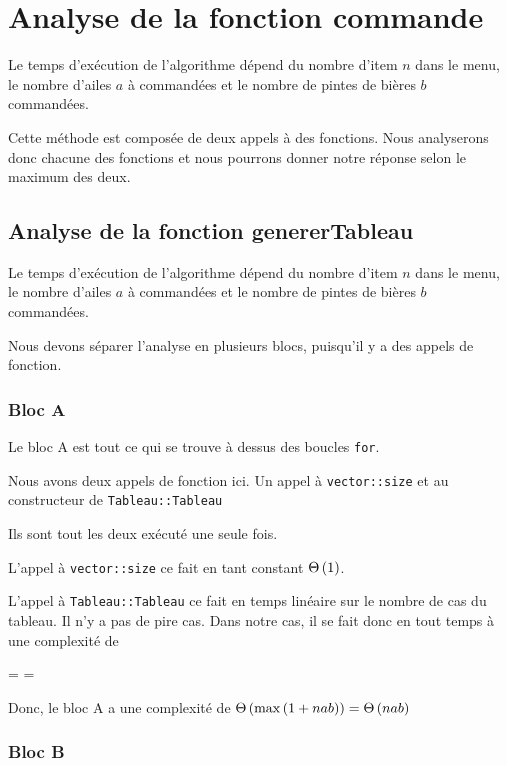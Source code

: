 \documentclass[class=article]{standalone}
\begin{document}
\section*{Analyse de la fonction commande}

Le temps d'exécution de l'algorithme dépend du nombre d'item $n$ dans le menu,
le nombre d'ailes $a$ à commandées et le nombre de pintes de bières $b$ commandées.

Cette méthode est composée de deux appels à des fonctions. Nous analyserons donc
chacune des fonctions et nous pourrons donner notre réponse selon le maximum des deux.

\subsection*{Analyse de la fonction genererTableau }

Le temps d'exécution de l'algorithme dépend du nombre d'item $n$ dans le menu,
le nombre d'ailes $a$ à commandées et le nombre de pintes de bières $b$ commandées.

Nous devons séparer l'analyse en plusieurs blocs, puisqu'il y a des appels de fonction.

\subsubsection*{Bloc A}

Le bloc A est tout ce qui se trouve à dessus des boucles \lstinline{for}.

Nous avons deux appels de fonction ici. Un appel à \lstinline{vector::size} et au constructeur
de \lstinline{Tableau::Tableau}

Ils sont tout les deux exécuté une seule fois.

L'appel à \lstinline{vector::size} ce fait en tant constant $\Theta\left ( 1 \right )$.

L'appel à \lstinline{Tableau::Tableau} ce fait en temps linéaire sur le nombre de cas du tableau.
Il n'y a pas de pire cas.
Dans notre cas, il se fait donc en tout temps à une complexité de
\begin{deriv}
\Theta{}
\<= 
\Theta{} 
\<= 
\Theta{} 
\end{deriv}

Donc, le bloc A a une complexité de $\Theta\left ( \max\left ( 1 + nab \right ) \right ) = \Theta\left ( nab \right )$


\subsubsection*{Bloc B}
\end{document}
